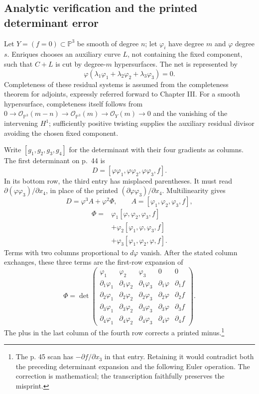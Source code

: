 \subsection{Analytic verification and the printed determinant error}

Let \(Y=(f=0)\subset\mathbb{P}^3\) be smooth of degree \(n\); let \(\varphi_i\) have degree \(m\) and \(\varphi\) degree \(s\). Enriques chooses an auxiliary curve \(L\), not containing the fixed component, such that \(C+L\) is cut by degree-\(m\) hypersurfaces. The net is represented by \[
\varphi(\lambda_1\varphi_1+\lambda_2\varphi_2+\lambda_3\varphi_3)=0.
\] Completeness of these residual systems is assumed from the completeness theorem for adjoints, expressly referred forward to Chapter III. For a smooth hypersurface, completeness itself follows from \(0\to\mathcal O_{\mathbb{P}^3}(m-n)\to\mathcal O_{\mathbb{P}^3}(m)\to\mathcal O_Y(m)\to0\) and the vanishing of the intervening \(H^1\); sufficiently positive twisting supplies the auxiliary residual divisor avoiding the chosen fixed component.

Write \([g_1,g_2,g_3,g_4]\) for the determinant with their four gradients as columns. The first determinant on p.~44 is \[
D=[\varphi\varphi_1,\varphi\varphi_2,\varphi\varphi_3,f].
\] In its bottom row, the third entry has misplaced parentheses. It must read \(\partial(\varphi\varphi_3)/\partial x_4\), in place of the printed \((\partial\varphi\varphi_3)/\partial x_4\). Multilinearity gives \[
D=\varphi^3 A+\varphi^2\Phi,\qquad A=[\varphi_1,\varphi_2,\varphi_3,f],
\] \[
\begin{aligned}
\Phi={}&\varphi_1[\varphi,\varphi_2,\varphi_3,f]\\
&+\varphi_2[\varphi_1,\varphi,\varphi_3,f]\\
&+\varphi_3[\varphi_1,\varphi_2,\varphi,f].
\end{aligned}
\] Terms with two columns proportional to \(d\varphi\) vanish. After the stated column exchanges, these three terms are the first-row expansion of \[
\Phi=\det\begin{pmatrix}
\varphi_1&\varphi_2&\varphi_3&0&0\\
\partial_1\varphi_1&\partial_1\varphi_2&\partial_1\varphi_3&\partial_1\varphi&\partial_1f\\
\partial_2\varphi_1&\partial_2\varphi_2&\partial_2\varphi_3&\partial_2\varphi&\partial_2f\\
\partial_3\varphi_1&\partial_3\varphi_2&\partial_3\varphi_3&\partial_3\varphi&\partial_3f\\
\partial_4\varphi_1&\partial_4\varphi_2&\partial_4\varphi_3&\partial_4\varphi&\partial_4f
\end{pmatrix}.
\] The plus in the last column of the fourth row corrects a printed minus.\footnote{The p. 45 scan has \(-\partial f/\partial x_3\) in that entry. Retaining it would contradict both the preceding determinant expansion and the following Euler operation. The correction is mathematical; the transcription faithfully preserves the misprint.}

